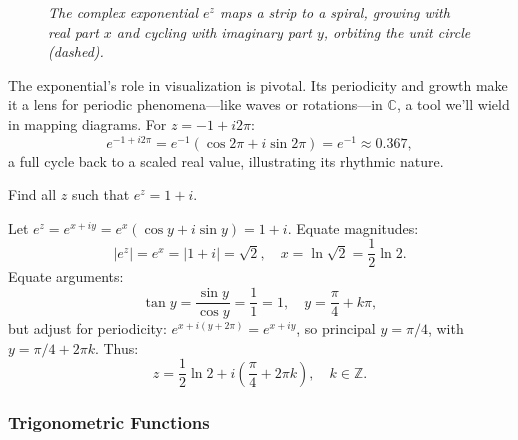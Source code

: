 \begin{figure}[H]
\centering
{}
\caption{\textit{The complex exponential $e^z$ maps a strip to a spiral, growing with real part $x$ and cycling with imaginary part $y$, orbiting the unit circle (dashed).}}
\label{fig:exp-spiral}
\end{figure}

\noindent The exponential’s role in visualization is pivotal. Its periodicity and growth make it a lens for periodic phenomena—like waves or rotations—in $\mathbb{C}$, a tool we’ll wield in mapping diagrams. For $z = -1 + i 2\pi$:
\[
e^{-1 + i 2\pi} = e^{-1} (\cos 2\pi + i \sin 2\pi) = e^{-1} \approx 0.367,
\]
a full cycle back to a scaled real value, illustrating its rhythmic nature.

\exampleline
\begin{example}
Find all $z$ such that $e^z = 1 + i$.

\begin{solution}
Let $e^z = e^{x + i y} = e^x (\cos y + i \sin y) = 1 + i$. Equate magnitudes:
\[
|e^z| = e^x = |1 + i| = \sqrt{2}, \quad x = \ln \sqrt{2} = \frac{1}{2} \ln 2.
\]
Equate arguments:
\[
\tan y = \frac{\sin y}{\cos y} = \frac{1}{1} = 1, \quad y = \frac{\pi}{4} + k\pi,
\]
but adjust for periodicity: $e^{x + i (y + 2\pi)} = e^{x + i y}$, so principal $y = \pi/4$, with $y = \pi/4 + 2\pi k$. Thus:
\[
z = \frac{1}{2} \ln 2 + i \left( \frac{\pi}{4} + 2\pi k \right), \quad k \in \mathbb{Z}.
\]
\end{solution}
\end{example}
\exampleline


\subsubsection*{Trigonometric Functions} 

